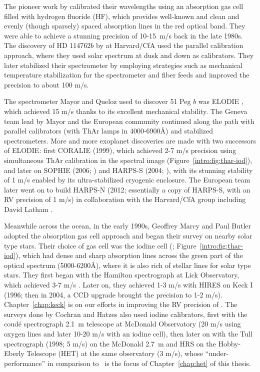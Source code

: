The pioneer work by \cite{1988ApJ...331..902C} calibrated their
wavelengths using an absorption gas cell filled with hydrogen fluoride
(HF), which provides well-known and clean and evenly (though sparsely)
spaced absorption lines in the red optical band. They were able to
achieve a stunning precision of 10-15~m/s back in the late 1980s. The
discovery of HD 114762$b$ by \cite{1989Natur.339...38L} at Harvard/CfA
used the parallel calibration approach, where they used solar spectrum
at dusk and down as calibrators. They later stabilized their
spectrometer by employing strategies such as mechanical temperature
stabilization for the spectrometer and fiber feeds and improved the
precision to about 100 m/s.

The spectrometer Mayor and Queloz used to discover 51 Peg $b$ was
ELODIE \citep{elodie}, which achieved 15 m/s thanks to its excellent
mechanical stability. The Geneva team lead by Mayor and the European
community continued along the path with parallel calibrators (with
ThAr lamps in 4000-6900\AA) and stabilized spectrometers. More and
more exoplanet discoveries are made with two successors of ELODIE:
first CORALIE (1999), which achieved 2-7 m/s precision using
simultaneous ThAr calibration in the spectral image
(Figure~\ref{intro:fig:thar-iod}), and later on SOPHIE (2006;
\citealt{2008SPIE.7014E..0JP}) and HARPS-S (2004; \citealt{harps-s}),
with its stunning stability of 1 m/s enabled by its ultra-stabilized
cryogenic enclosure. The European team later went on to build HARPS-N
(2012; essentially a copy of HARPS-S, with an RV precision of 1 m/s) in
collaboration with the Harvard/CfA group including David Latham
\citep{2012SPIE.8446E..1VC}. 

Meanwhile across the ocean, in the early 1990s, Geoffrey Marcy and
Paul Butler adopted the absorption gas cell approach and began their
survey on nearby solar type stars. Their choice of gas cell was the
iodine cell (\citealt{1992PASP..104..270M};
Figure~\ref{intro:fig:thar-iod}), which had dense and sharp absorption
lines across the green part of the optical spectrum (5000-6200\AA),
where it is also rich of stellar lines for solar type stars. They
first began with the Hamilton spectrograph at Lick Observatory, which
achieved 3-7 m/s \citep{2014ApJS..210....5F}. Later on, they achieved
1-3 m/s with HIRES on Keck I (1996; then in 2004, a CCD upgrade
brought the precision to 1-2 m/s). Chapter~\ref{chap:keck} is on our
efforts in improving the RV precision of \keck. The surveys done by
Cochran and Hatzes also used iodine calibrators, first with the
coud\'e spectrograph 2.1~m telescope at McDonald Observatory (20 m/s
using oxygen lines and later 10-20 m/s with an iodine cell), then
later on with the Tull spectrograph (1998; 5 m/s) on the McDonald
2.7~m and HRS on the Hobby-Eberly Telescope (HET) at the same
observatory (3 m/s), whose ``under-performance'' in comparison to
\keck\ is the focus of Chapter~\ref{chap:het} of this thesis.

